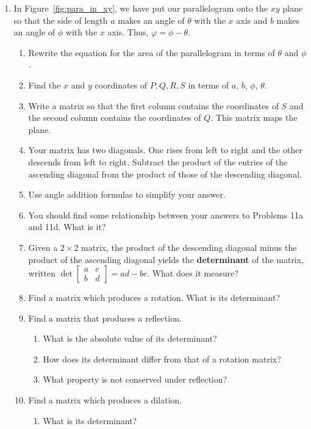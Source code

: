 \documentclass[../textbook.tex]{subfiles}
\begin{document}
\begin{enumerate}
\setcounter{enumi}{\value{problem_i}}
\item In Figure~\ref{fig:para_in_xy}, we have put our parallelogram onto the $xy$ plane so that the side of length $a$ makes an angle of $\theta$ with the $x$ axis and $b$ makes an angle of $\phi$ with the $x$ axis. Thus, $\varphi=\phi-\theta$.
\begin{enumerate}
\item Rewrite the equation for the area of the parallelogram in terms of $\theta$ and $\phi$.
\item Find the $x$ and $y$ coordinates of $P,Q,R,S$ in terms of $a$, $b$, $\phi$, $\theta$.
\item Write a matrix so that the first column contains the coordinates of $S$ and the second column contains the coordinates of $Q$. This matrix maps the plane.
\item Your matrix has two diagonals. One rises from left to right and the other descends from left to right. Subtract the product of the entries of the ascending diagonal from the product of those of the descending diagonal.
\item Use angle addition formulas to simplify your answer.
\item You should find some relationship between your answers to Problems 11a and 11d. What is it?
\item Given a $2\times 2$ matrix, the product of the descending diagonal minus the product of the ascending diagonal yields the \textbf{determinant} of the matrix, written $\det \left[\begin{array}{cc}a & c \\ b & d \end{array}\right]=ad-bc$. What does it measure?
\item Find a matrix which produces a rotation. What is its determinant?
\item Find a matrix that produces a reflection.
\begin{enumerate}
\item What is the absolute value of its determinant?
\item How does its determinant differ from that of a rotation matrix?
\item What property is not conserved under reflection?
\end{enumerate}
\item Find a matrix which produces a dilation.
\begin{enumerate}
\item What is its determinant?

\end{enumerate}
\end{enumerate}
\end{enumerate}
\end{document}
